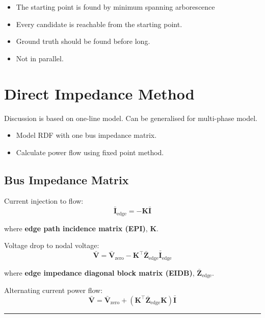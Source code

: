 \documentclass[
]{book}
\providecommand{\tightlist}{%
  \setlength{\itemsep}{0pt}\setlength{\parskip}{0pt}}
\begin{document}
\begin{itemize}
\tightlist
\item
  The starting point is found by minimum spanning arborescence
\item
  Every candidate is reachable from the starting point.
\item
  Ground truth should be found before long.
\item
  Not in parallel.
\end{itemize}

\hypertarget{direct-impedance-method}{%
\chapter{Direct Impedance Method}\label{direct-impedance-method}}

Discussion is based on one-line model. Can be generalised for multi-phase
model.

\begin{itemize}
\tightlist
\item
  Model RDF with one bus impedance matrix.
\item
  Calculate power flow using fixed point method.
\end{itemize}

\hypertarget{BIM}{%
\section{Bus Impedance Matrix}\label{BIM}}

Current injection to flow:
\[
  \bar{\boldsymbol{I}}_{\text{edge}} =
  - \boldsymbol{K} \bar{\boldsymbol{I}}
\]

where \textbf{edge path incidence matrix (EPI)}, \(\boldsymbol{K}\).

Voltage drop to nodal voltage:
\[
  \bar{\boldsymbol{V}} =
  \bar{\boldsymbol{V}}_{\text{zero}}
  - \boldsymbol{K}^{\top} \boldsymbol{\bar{Z}}_\text{edge}
  \bar{\boldsymbol{I}}_{\text{edge}} 
\]

where \textbf{edge impedance diagonal block matrix (EIDB)},
\(\boldsymbol{\bar{Z}}_\text{edge}\).

Alternating current power flow:
\[
  \bar{\boldsymbol{V}} = \bar{\boldsymbol{V}}_{\text{zero}}
    + \left( \boldsymbol{K}^{\top} \boldsymbol{\bar{Z}}_\text{edge}
    \boldsymbol{K} \right) \bar{\boldsymbol{I}}
\]

\begin{center}\rule{0.5\linewidth}{0.5pt}\end{center}
\end{document}

